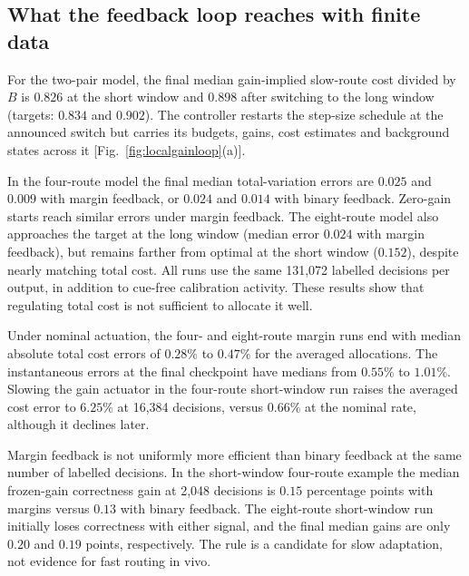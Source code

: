 \subsection{What the feedback loop reaches with finite data}

For the two-pair model, the final median gain-implied slow-route
cost divided by \(B\) is \(0.826\) at the short window and
\(0.898\) after switching to the long window (targets: \(0.834\)
and \(0.902\)). The controller restarts the step-size schedule at
the announced switch but carries its budgets, gains, cost estimates
and background states across it [Fig.~\ref{fig:localgainloop}(a)].

In the four-route model the final median total-variation errors are
\(0.025\) and \(0.009\) with margin feedback, or \(0.024\) and
\(0.014\) with binary feedback. Zero-gain starts reach similar
errors under margin feedback. The eight-route model also approaches
the target at the long window (median error \(0.024\) with margin
feedback), but remains farther from optimal at the short window
(\(0.152\)), despite nearly matching total cost. All runs use the
same 131,072 labelled decisions per output, in addition to cue-free
calibration activity. These results show that regulating total cost
is not sufficient to allocate it well.

Under nominal actuation, the four- and eight-route margin runs
end with median absolute total cost errors of \(0.28\%\) to
\(0.47\%\) for the averaged allocations. The instantaneous errors
at the final checkpoint have medians from \(0.55\%\) to \(1.01\%\).
Slowing the gain actuator in the four-route short-window run raises
the averaged cost error to \(6.25\%\) at 16,384 decisions, versus
\(0.66\%\) at the nominal rate, although it declines later.

Margin feedback is not uniformly more efficient than binary
feedback at the same number of labelled decisions. In the short-window
four-route example the median frozen-gain correctness gain at 2,048
decisions is \(0.15\) percentage points with margins versus \(0.13\)
with binary feedback. The eight-route short-window run initially
loses correctness with either signal, and the final median gains
are only \(0.20\) and \(0.19\) points, respectively. The rule is a
candidate for slow adaptation, not evidence for fast routing in vivo.

